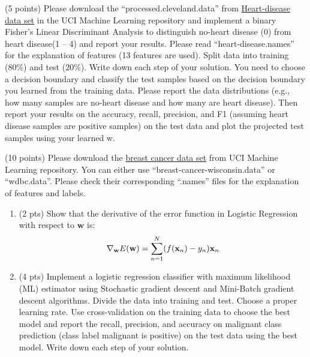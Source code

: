 \documentclass{exam}
\newcommand{\xx}{{\bf{x}}}
\newcommand{\ww}{{\bf{w}}}
\begin{document}
\begin{questions}

 (5 points) Please download the ``processed.cleveland.data'' from \href{https://archive.ics.uci.edu/dataset/45/heart+disease}{Heart-disease data set} in the UCI Machine Learning repository and implement a binary Fisher's Linear Discriminant Analysis to distinguish no-heart disease (0) from heart disease(1 -- 4) and report your results.  Please read ``heart-disease.names'' for the explanation of features (13 features are used). Split data into training (80\%) and test (20\%). Write down each step of your solution.  You need to choose a decision boundary and classify the test samples based on the decision boundary you learned from the training data. Please report the data distributions (e.g., how many samples are no-heart disease and how many are heart disease). Then report your results on the accuracy, recall, precision, and F1 (assuming heart disease samples are positive samples) on the test data and plot the projected test samples using your learned w.
\vspace{5em}
 
  (10 points) Please download the \href{https://archive.ics.uci.edu/ml/datasets/Breast+Cancer+Wisconsin+\%28Diagnostic\%29}{breast cancer data set} from UCI Machine Learning repository. You can either use ``breast-cancer-wisconsin.data'' or ``wdbc.data''. Please check their corresponding ``.names'' files for the explanation of features and labels.

\begin{enumerate}
\item (2 pts) Show that the derivative of the error function in Logistic Regression with respect to $\mathbf{w}$ is:
\begin{equation*}
\nabla_\ww E(\ww)=\sum_{n=1}^{N}(f(\xx_n)-y_n)\xx_n 
\end{equation*}

\item (4 pts) Implement a logistic regression classifier with maximum likelihood (ML) estimator using Stochastic gradient descent and Mini-Batch gradient descent algorithms. Divide the data into training and test. Choose a proper learning rate. Use cross-validation on the training data to choose the best model and report the recall, precision, and accuracy on malignant class prediction (class label malignant is positive) on the test data using the best model. Write down each step of your solution.


\end{enumerate}
\end{questions}
\end{document}
